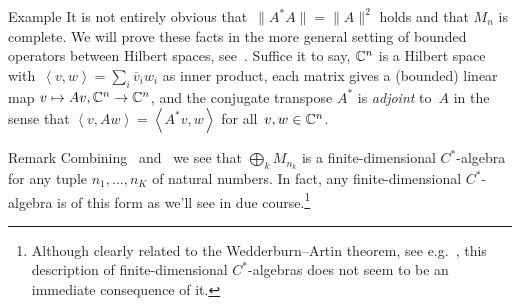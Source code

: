 \documentclass[a]{subfiles}
\begin{document}
\begin{parsec}
\begin{point}{Example}
It is not entirely obvious that~$\|A^*A\|=\|A\|^2$
holds
and that $M_n$ is complete.
We will prove these facts in the more general setting
of bounded operators between Hilbert spaces, 
see~.
Suffice it to say, $\mathbb{C}^n$ is a Hilbert space
with~$\left<v,w\right>=\sum_i \overline{v}_iw_i$
as inner product,
each matrix gives a (bounded) linear map $v\mapsto Av,\mathbb{C}^n\to \mathbb{C}^n$,
and the conjugate transpose $A^*$ is \emph{adjoint} to~$A$
in the sense that $\left<v,Aw\right> = \left<A^*v,w\right>$
for all~$v,w\in\mathbb{C}^n$.
\end{point}
\begin{point}{Remark}%
Combining~
and~
we see that
$\bigoplus_k M_{n_k}$
is a finite-dimensional
$C^*$-algebra
for any tuple $n_1,\dotsc,n_K$
of natural numbers.
In fact,
any finite-dimensional $C^*$-algebra
is of this form
as we'll see in due course.\footnote{Although
clearly related to the 
Wedderburn--Artin theorem,
see e.g.~\cite{nicholson1993},
this description of finite-dimensional
$C^*$-algebras
does not seem to be an immediate consequence of it.}
\end{point}
\end{parsec}
\end{document}
